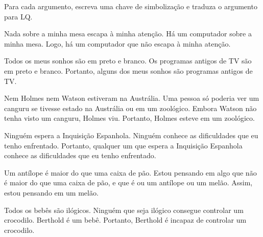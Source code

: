 \problempart
\label{pr.QLarguments}
Para cada argumento, escreva uma chave de simbolização e traduza o argumento para LQ.
\begin{earg}
\item Nada sobre a minha mesa escapa à minha atenção. Há um computador sobre a minha mesa. Logo, há um computador que não escapa à minha atenção.
\item Todos os meus sonhos são em preto e branco. Os programas antigos de TV são em preto e branco. Portanto, alguns dos meus sonhos são programas antigos de TV.
\item Nem Holmes nem Watson estiveram na Austrália. Uma pessoa só poderia ver um canguru se tivesse estado na Austrália ou em um zoológico. Embora Watson não tenha visto um canguru, Holmes viu. Portanto, Holmes esteve em um zoológico.
\item Ninguém espera a Inquisição Espanhola. Ninguém conhece as dificuldades que eu tenho enfrentado. Portanto, qualquer um que espera a Inquisição Espanhola conhece as dificuldades que eu tenho enfrentado.
\item Um antílope é maior do que uma caixa de pão. Estou pensando em algo que não é maior do que uma caixa de pão, e que é ou um antílope ou um melão. Assim, estou pensando em um melão.
\item Todos os bebês são ilógicos. Ninguém que seja ilógico consegue controlar um crocodilo. Berthold é um bebê. Portanto, Berthold é incapaz de controlar um crocodilo.
\end{earg}

